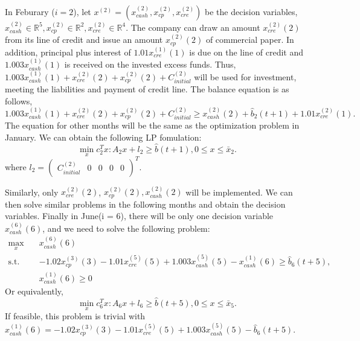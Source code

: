 \documentclass[14pt]{article}
\begin{document}
    In Feburary ($i = 2$), let $x^{(2)}=(x^{(2)}_{cash}, x^{(2)}_{cp}, x^{(2)}_{cre})$ be the decision variables, $x^{(2)}_{cash}\in\mathbb{R}^5, x^{(2)}_{cp}\in\mathbb{R}^2, x^{(2)}_{cre}\in\mathbb{R}^4$. The company can draw an amount $x^{(2)}_{cre}(2)$ from its line of credit and issue an amount $x^{(2)}_{cp}(2)$ of commercial paper. In addition, principal plus interest of $1.01x^{(1)}_{cre}(1)$ is due on the line of credit and $1.003x^{(1)}_{cash}(1)$ is received on the invested excess funds. Thus, $1.003x^{(1)}_{cash}(1)+x^{(2)}_{cre}(2)+x^{(2)}_{cp}(2)+C^{(2)}_{initial}$ will be used for investment, meeting the liabilities and payment of credit line. The balance equation is as follows, 
        \[
            1.003x^{(1)}_{cash}(1)+x^{(2)}_{cre}(2)+x^{(2)}_{cp}(2)+C^{(2)}_{initial}\geq x^{(2)}_{cash}(2) + \hat{b}_2(t+1)+1.01x^{(2)}_{cre}(1).
        \]
    The equation for other months will be the same as the optimization problem in January. We can obtain the following LP fomulation:
    \begin{equation}\label{eq:naiveFeb}
        \min_x c_2^Tx: A_2x+l_2\geq\hat{b}(t+1), 0\leq x\leq \bar{x}_2.
    \end{equation}
    where $l_2 = \begin{pmatrix}C^{(2)}_{initial} & 0& 0& 0& 0\end{pmatrix}^T$.

    Similarly, only $x^{(2)}_{cre}(2)$, $x^{(2)}_{cp}(2), x^{(2)}_{cash}(2)$ will be implemented. We can then solve similar problems in the following months and obtain the decision variables. Finally in June(i = 6), there will be only one decision variable $x^{(6)}_{cash}(6)$, and we need to solve the following problem:
    \[
        \begin{split}
            \max_{x} \quad & x^{(6)}_{cash}(6) \\
            \text{s.t.} \quad 
            & - 1.02x^{(3)}_{cp}(3) - 1.01x^{(5)}_{cre}(5) + 1.003x^{(5)}_{cash}(5) - x^{(1)}_{cash}(6) \geq \hat{b}_6(t+5),  \\
            & x^{(1)}_{cash}(6)\geq 0
        \end{split}
    \]
    Or equivalently,
    \begin{equation}\label{eq:naiveJune}
        \min_x c_6^Tx: A_6x+l_6\geq\hat{b}(t+5), 0\leq x\leq \bar{x}_5.
    \end{equation}
    If feasible, this problem is trivial with $x^{(1)}_{cash}(6) = - 1.02x^{(3)}_{cp}(3) - 1.01x^{(5)}_{cre}(5) + 1.003x^{(5)}_{cash}(5) - \hat{b}_6(t+5).$
\end{document}
